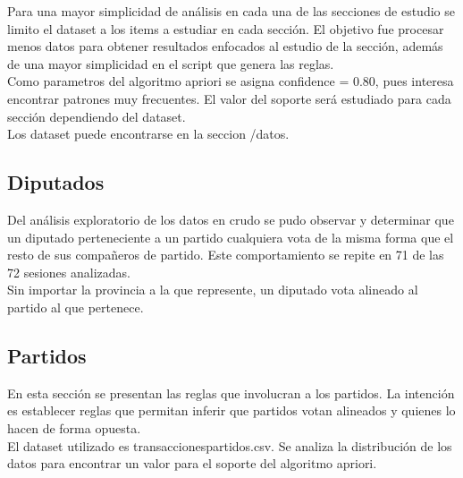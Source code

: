 \documentclass{endm}
\begin{document}
Para una mayor simplicidad de análisis en cada una de las secciones de estudio se limito el dataset a los items a estudiar en cada sección. El objetivo fue procesar menos datos para obtener resultados enfocados al estudio de la sección, además de una mayor simplicidad en el script que genera las reglas.\\

Como parametros del algoritmo apriori se asigna confidence = 0.80, pues interesa encontrar patrones muy frecuentes. El valor del soporte será estudiado para cada sección dependiendo del dataset. \\

Los dataset puede encontrarse en la seccion /datos. \\

\subsection{Diputados}

Del análisis exploratorio de los datos en crudo se pudo observar y determinar que un diputado perteneciente a un partido cualquiera vota de la misma forma que el resto de sus compañeros de partido. Este comportamiento se repite en 71 de las 72 sesiones analizadas.\\

Sin importar la provincia a la que represente, un diputado vota alineado al partido al que pertenece.\\

\subsection{Partidos}

En esta sección se presentan las reglas que involucran a los partidos. La intención es establecer reglas que permitan inferir que partidos votan alineados y quienes lo hacen de forma opuesta. \\

El dataset utilizado es transaccionespartidos.csv. Se analiza la distribución de los datos para encontrar un valor para el soporte del algoritmo apriori. \\
\end{document}
